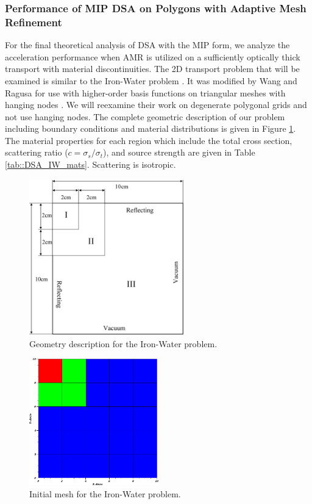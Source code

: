 \subsubsection{Performance of MIP DSA on Polygons with Adaptive Mesh Refinement}
\label{sec::DSA_Results_1G_AMR}

For the final theoretical analysis of DSA with the MIP form, we analyze the acceleration performance when AMR is utilized on a sufficiently optically thick transport with material discontinuities. The 2D transport problem that will be examined is similar to the Iron-Water problem \cite{khalil1985nodal}. It was modified by Wang and Ragusa for use with higher-order basis functions on triangular meshes with hanging nodes \cite{ref::DSA_wang_ragusa}. We will reexamine their work on degenerate polygonal grids and not use hanging nodes. The complete geometric description of our problem including boundary conditions and material distributions is given in Figure \ref{fig::DSA_IW_Description}. The material properties for each region which include the total cross section, scattering ratio ($c=\sigma_s/\sigma_t$), and source strength are given in Table \ref{tab::DSA_IW_mats}. Scattering is isotropic. 


\begin{figure}
\centering
\includegraphics[width=0.60\textwidth]{figures/sec_DSA/IW_Description.png}
\caption{Geometry description for the Iron-Water problem.}
\label{fig::DSA_IW_Description}
\end{figure}

\begin{figure}
\centering
\includegraphics[width=0.50\textwidth]{figures/sec_DSA/IW_starting_mesh.png}
\caption{Initial mesh for the Iron-Water problem.}
\label{fig::DSA_IW_starting_mesh}
\end{figure}

